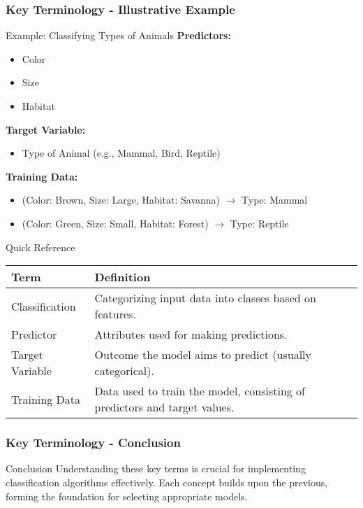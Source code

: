 \documentclass{beamer}
\begin{document}
\begin{frame}[fragile]
    \frametitle{Key Terminology - Illustrative Example}
    \begin{block}{Example: Classifying Types of Animals}
        \textbf{Predictors:}
        \begin{itemize}
            \item Color
            \item Size
            \item Habitat
        \end{itemize}
        
        \textbf{Target Variable:}
        \begin{itemize}
            \item Type of Animal (e.g., Mammal, Bird, Reptile)
        \end{itemize}
      
        \textbf{Training Data:}
        \begin{itemize}
            \item (Color: Brown, Size: Large, Habitat: Savanna) $\to$ Type: Mammal
            \item (Color: Green, Size: Small, Habitat: Forest) $\to$ Type: Reptile
        \end{itemize}
    \end{block}
    
    \begin{block}{Quick Reference}
        \begin{tabular}{|l|l|}
            \hline
            \textbf{Term} & \textbf{Definition} \\
            \hline
            Classification & Categorizing input data into classes based on features. \\
            \hline
            Predictor & Attributes used for making predictions. \\
            \hline
            Target Variable & Outcome the model aims to predict (usually categorical). \\
            \hline
            Training Data & Data used to train the model, consisting of predictors and target values. \\
            \hline
        \end{tabular}
    \end{block}
\end{frame}

\begin{frame}[fragile]
    \frametitle{Key Terminology - Conclusion}
    \begin{block}{Conclusion}
        Understanding these key terms is crucial for implementing classification algorithms effectively. Each concept builds upon the previous, forming the foundation for selecting appropriate models.
    \end{block}
\end{frame}
\end{document}
